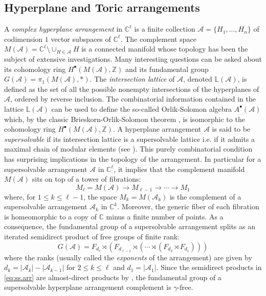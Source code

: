 \documentclass{amsart}
\theoremstyle{plain}
\theoremstyle{definition}
\numberwithin{theorem}{section}
\numberwithin{equation}{section}
\newcommand{\Z}{\mathbb Z}
\begin{document}
\subsection{Hyperplane and Toric arrangements}
A \emph{complex hyperplane arrangement} in $\mathbb C^\ell$ is a finite collection $\mathcal A = \{H_1, \dots, H_n\}$ of codimension $1$ vector subspaces of $\mathbb C^\ell$. The complement space $M(\mathcal A) = \mathbb C^\ell \setminus \cup_{H \in \mathcal A} H$ is a connected manifold whose topology has been the subject of extensive investigations. Many interesting questions can be asked about its cohomology ring $H^\bullet(M(\mathcal A), \Z)$ and its fundamental group $G(\mathcal A) = \pi_1(M(\mathcal A), *)$. 
The \emph{intersection lattice} of $\mathcal A$, denoted $\mathbb L(\mathcal A)$, is defined as the set of all the possible nonempty intersections of the hyperplanes of $\mathcal A$, ordered by reverse inclusion. The combinatorial information contained in the lattice $\mathbb L(\mathcal A)$ can be used to define the so-called Orlik-Solomon algebra $A^\bullet(\mathcal A)$ which, by the classic Brieskorn-Orlik-Solomon theorem \cite{OS80}, is isomorphic to the cohomology ring $H^\bullet(M(\mathcal A),\Z)$. A hyperplane arrangement $\mathcal A$ is said to be \emph{supersolvable} if its intersection lattice is a supersolvable lattice i.e. if it admits a maximal chain of modular elements (see \cite{Sta72}). This purely combinatorial condition has surprising implications in the topology of the arrangement. In particular for a supersolvable arrangement $\mathcal A$ in $\mathbb C^\ell$, it implies that the complement manifold $M(\mathcal A)$ sits on top of a tower of fibrations:
\[
	M_\ell = M(\mathcal  A) \longrightarrow M_{\ell-1} \longrightarrow \cdots \longrightarrow M_1 
\]
where, for $1 \leq k \leq \ell-1$, the space $M_k = M(\mathcal A_k)$ is the complement of a supersolvable arrangement $\mathcal A_k$ in $\mathbb C^k$. Moreover, the generic fiber of each fibration is homeomorphic to a copy of $\mathbb C$ minus a finite number of points. As a consequence, the fundamental group of a supersolvable arrangement splits as an iterated semidirect product of free groups of finite rank: 
\begin{equation}\label{eq:ss.arr}
    G(\mathcal A) = F_{d_\ell} \rtimes (F_{d_{\ell-1}} \rtimes ( \cdots \rtimes (F_{d_2} \rtimes F_{d_1} )))
\end{equation} 
where the ranks (usually called the \emph{exponents} of the arrangement) are given by $d_k = |\mathcal A_k| - |\mathcal A_{k-1}|$ 
for $2 \leq k \leq \ell$ and $d_1 = |\mathcal A_1|$. Since the semidirect products in \eqref{eq:ss.arr} are almost-direct products by \cite[Proposition 2.5]{FR85}, the fundamental group of a supersolvable hyperplane arrangement complement is $\gamma$-free.
\end{document}
